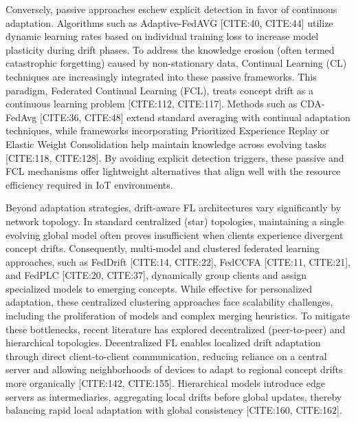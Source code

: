 \documentclass[journal]{IEEEtran}
\begin{document}
Conversely, passive approaches eschew explicit detection in favor of continuous adaptation. Algorithms such as Adaptive-FedAVG [CITE:40, CITE:44] utilize dynamic learning rates based on individual training loss to increase model plasticity during drift phases. To address the knowledge erosion (often termed catastrophic forgetting) caused by non-stationary data, Continual Learning (CL) techniques are increasingly integrated into these passive frameworks. This paradigm, Federated Continual Learning (FCL), treats concept drift as a continuous learning problem [CITE:112, CITE:117]. Methods such as CDA-FedAvg [CITE:36, CITE:48] extend standard averaging with continual adaptation techniques, while frameworks incorporating Prioritized Experience Replay or Elastic Weight Consolidation help maintain knowledge across evolving tasks [CITE:118, CITE:128]. By avoiding explicit detection triggers, these passive and FCL mechanisms offer lightweight alternatives that align well with the resource efficiency required in IoT environments.

Beyond adaptation strategies, drift-aware FL architectures vary significantly by network topology. In standard centralized (star) topologies, maintaining a single evolving global model often proves insufficient when clients experience divergent concept drifts. Consequently, multi-model and clustered federated learning approaches, such as FedDrift [CITE:14, CITE:22], FedCCFA [CITE:11, CITE:21], and FedPLC [CITE:20, CITE:37], dynamically group clients and assign specialized models to emerging concepts. While effective for personalized adaptation, these centralized clustering approaches face scalability challenges, including the proliferation of models and complex merging heuristics. To mitigate these bottlenecks, recent literature has explored decentralized (peer-to-peer) and hierarchical topologies. Decentralized FL enables localized drift adaptation through direct client-to-client communication, reducing reliance on a central server and allowing neighborhoods of devices to adapt to regional concept drifts more organically [CITE:142, CITE:155]. Hierarchical models introduce edge servers as intermediaries, aggregating local drifts before global updates, thereby balancing rapid local adaptation with global consistency [CITE:160, CITE:162].
\end{document}
